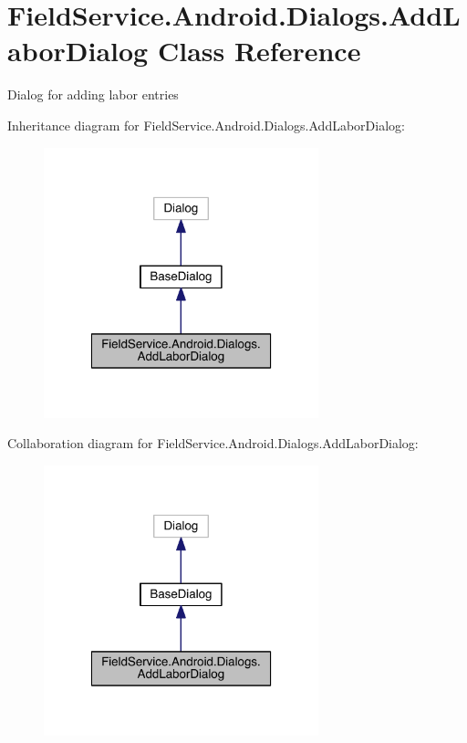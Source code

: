 \hypertarget{class_field_service_1_1_android_1_1_dialogs_1_1_add_labor_dialog}{\section{Field\+Service.\+Android.\+Dialogs.\+Add\+Labor\+Dialog Class Reference}
\label{class_field_service_1_1_android_1_1_dialogs_1_1_add_labor_dialog}
}


Dialog for adding labor entries  




Inheritance diagram for Field\+Service.\+Android.\+Dialogs.\+Add\+Labor\+Dialog\+:
\nopagebreak
\begin{figure}[H]
\begin{center}
\leavevmode
\includegraphics[width=226pt]{class_field_service_1_1_android_1_1_dialogs_1_1_add_labor_dialog__inherit__graph}
\end{center}
\end{figure}


Collaboration diagram for Field\+Service.\+Android.\+Dialogs.\+Add\+Labor\+Dialog\+:
\nopagebreak
\begin{figure}[H]
\begin{center}
\leavevmode
\includegraphics[width=226pt]{class_field_service_1_1_android_1_1_dialogs_1_1_add_labor_dialog__coll__graph}
\end{center}
\end{figure}
